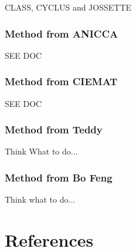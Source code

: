 \documentclass[review]{elsarticle}
\begin{document}
CLASS, CYCLUS and JOSSETTE

    \subsubsection{Method from ANICCA}

SEE DOC

    \subsubsection{Method from CIEMAT}

SEE DOC

    \subsubsection{Method from Teddy}

Think What to do...

    \subsubsection{Method from Bo Feng}

Think what to do...







\section*{References}


\end{document}
